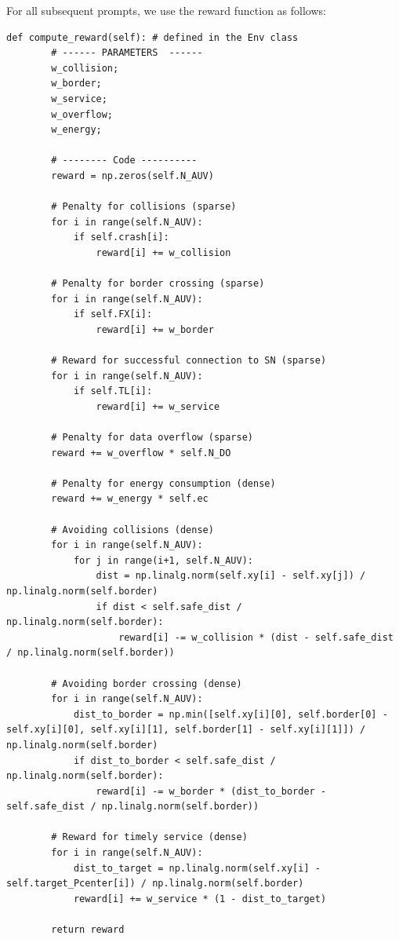 \documentclass{article}
\begin{document}
For all subsequent prompts, we use the reward function as follows:
\begin{verbatim}
def compute_reward(self): # defined in the Env class
        # ------ PARAMETERS  ------
        w_collision;
        w_border;
        w_service;
        w_overflow;
        w_energy;
        
        # -------- Code ----------
        reward = np.zeros(self.N_AUV)
        
        # Penalty for collisions (sparse)
        for i in range(self.N_AUV):
            if self.crash[i]:
                reward[i] += w_collision
        
        # Penalty for border crossing (sparse)
        for i in range(self.N_AUV):
            if self.FX[i]:
                reward[i] += w_border
        
        # Reward for successful connection to SN (sparse)
        for i in range(self.N_AUV):
            if self.TL[i]:
                reward[i] += w_service
        
        # Penalty for data overflow (sparse)
        reward += w_overflow * self.N_DO
        
        # Penalty for energy consumption (dense)
        reward += w_energy * self.ec
        
        # Avoiding collisions (dense)
        for i in range(self.N_AUV):
            for j in range(i+1, self.N_AUV):
                dist = np.linalg.norm(self.xy[i] - self.xy[j]) / np.linalg.norm(self.border)
                if dist < self.safe_dist / np.linalg.norm(self.border):
                    reward[i] -= w_collision * (dist - self.safe_dist / np.linalg.norm(self.border))
        
        # Avoiding border crossing (dense)
        for i in range(self.N_AUV):
            dist_to_border = np.min([self.xy[i][0], self.border[0] - self.xy[i][0], self.xy[i][1], self.border[1] - self.xy[i][1]]) / np.linalg.norm(self.border)
            if dist_to_border < self.safe_dist / np.linalg.norm(self.border):
                reward[i] -= w_border * (dist_to_border - self.safe_dist / np.linalg.norm(self.border))
        
        # Reward for timely service (dense)
        for i in range(self.N_AUV):
            dist_to_target = np.linalg.norm(self.xy[i] - self.target_Pcenter[i]) / np.linalg.norm(self.border)
            reward[i] += w_service * (1 - dist_to_target)
        
        return reward
\end{verbatim}
\end{document}
